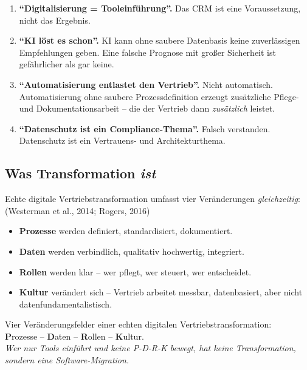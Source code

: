 \documentclass[11pt,a4paper,oneside]{article}
\newcommand{\caveatfontfallback}{\itshape}
\newcommand\caveatfont{\caveatfontfallback}%
\newcommand{\akzent}[1]{{\caveatfont\color{lpAmber}#1}}
\newcommand{\fachbegriff}[1]{\textbf{#1}}
\newcommand{\quelle}[1]{{\footnotesize\color{lpGray}(#1)}}
\begin{document}
\begin{enumerate}
  \item \fachbegriff{``Digitalisierung = Tooleinführung''.} Das CRM ist eine Voraussetzung, nicht das Ergebnis.
  \item \fachbegriff{``KI löst es schon''.} KI kann ohne saubere Datenbasis keine zuverlässigen Empfehlungen geben. Eine falsche Prognose mit großer Sicherheit ist gefährlicher als gar keine.
  \item \fachbegriff{``Automatisierung entlastet den Vertrieb''.} Nicht automatisch. Automatisierung ohne saubere Prozessdefinition erzeugt zusätzliche Pflege- und Dokumentationsarbeit -- die der Vertrieb dann \emph{zusätzlich} leistet.
  \item \fachbegriff{``Datenschutz ist ein Compliance-Thema''.} Falsch verstanden. Datenschutz ist ein Vertrauens- und Architekturthema.
\end{enumerate}

\subsection{Was Transformation \emph{ist}}

Echte digitale Vertriebstransformation umfasst vier Veränderungen \emph{gleichzeitig}: \quelle{Westerman et al., 2014; Rogers, 2016}

\begin{itemize}
  \item \textbf{Prozesse} werden definiert, standardisiert, dokumentiert.
  \item \textbf{Daten} werden verbindlich, qualitativ hochwertig, integriert.
  \item \textbf{Rollen} werden klar -- wer pflegt, wer steuert, wer entscheidet.
  \item \textbf{Kultur} verändert sich -- Vertrieb arbeitet messbar, datenbasiert, aber nicht datenfundamentalistisch.
\end{itemize}

\begin{eselsbox}[Eselsbrücke: \akzent{P-D-R-K}]
Vier Veränderungsfelder einer echten digitalen Vertriebstransformation:\\[2pt]
\textbf{P}rozesse -- \textbf{D}aten -- \textbf{R}ollen -- \textbf{K}ultur.\\[2pt]
\emph{Wer nur Tools einführt und keine P-D-R-K bewegt, hat keine Transformation, sondern eine Software-Migration.}
\end{eselsbox}
\end{document}

